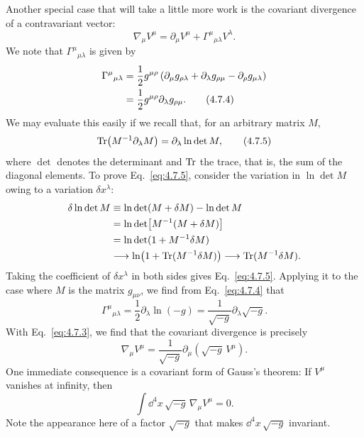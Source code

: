 Another special case that will take a little more work is the covariant
divergence of a contravariant vector:
\begin{equation}
  \nabla_\mu V^\mu
  =
  \partial_\mu V^\mu+\Gamma^\mu{}_{\mu\lambda}V^\lambda.
  \tag{4.7.3}\label{eq:4.7.3}
\end{equation}
We note that \(\Gamma^\mu{}_{\mu\lambda}\) is given by
\begin{align}
  \Gamma^\mu{}_{\mu\lambda}
  &=
  \frac12 g^{\mu\rho}
  \left(
    \partial_\mu g_{\rho\lambda}
    +\partial_\lambda g_{\rho\mu}
    -\partial_\rho g_{\mu\lambda}
  \right)
  \notag\\
  &=
  \frac12 g^{\mu\rho}\partial_\lambda g_{\rho\mu}.
  \tag{4.7.4}\label{eq:4.7.4}
\end{align}
We may evaluate this easily if we recall that, for an arbitrary matrix
\(M\),
\begin{equation}
  \operatorname{Tr}\!\left(M^{-1}\partial_\lambda M\right)
  =
  \partial_\lambda\ln\det M,
  \tag{4.7.5}\label{eq:4.7.5}
\end{equation}
where \(\det\) denotes the determinant and \(\operatorname{Tr}\) the trace, that is, the
sum of the diagonal elements. To prove Eq.~\eqref{eq:4.7.5}, consider the
variation in \(\ln\det M\) owing to a variation \(\delta x^\lambda\):
\begin{align*}
  \delta\ln\det M
  &\equiv\ln\det(M+\delta M)-\ln\det M
  \\
  &=\ln\det\!\left[M^{-1}(M+\delta M)\right]
  \\
  &=\ln\det(1+M^{-1}\delta M)
  \\
  &\longrightarrow\ln\!\left(1+\operatorname{Tr}(M^{-1}\delta M)\right)
  \longrightarrow\operatorname{Tr}(M^{-1}\delta M).
\end{align*}
Taking the coefficient of \(\delta x^\lambda\) in both sides gives
Eq.~\eqref{eq:4.7.5}. Applying it to the case where \(M\) is the matrix
\(g_{\mu\nu}\), we find from Eq.~\eqref{eq:4.7.4} that
\begin{equation}
  \Gamma^\mu{}_{\mu\lambda}
  =
  \frac12\partial_\lambda\ln(-g)
  =
  \frac{1}{\sqrt{-g}}\partial_\lambda\sqrt{-g}.
  \tag{4.7.6}\label{eq:4.7.6}
\end{equation}
With Eq.~\eqref{eq:4.7.3}, we find that the covariant divergence is
precisely
\begin{equation}
  \nabla_\mu V^\mu
  =
  \frac{1}{\sqrt{-g}}
  \partial_\mu\!\left(\sqrt{-g}\,V^\mu\right).
  \tag{4.7.7}\label{eq:4.7.7}
\end{equation}
One immediate consequence is a covariant form of Gauss's theorem: If
\(V^\mu\) vanishes at infinity, then
\begin{equation}
  \int\dd^4x\,\sqrt{-g}\,\nabla_\mu V^\mu=0.
  \tag{4.7.8}\label{eq:4.7.8}
\end{equation}
Note the appearance here of a factor \(\sqrt{-g}\) that makes
\(\dd^4x\,\sqrt{-g}\) invariant.

